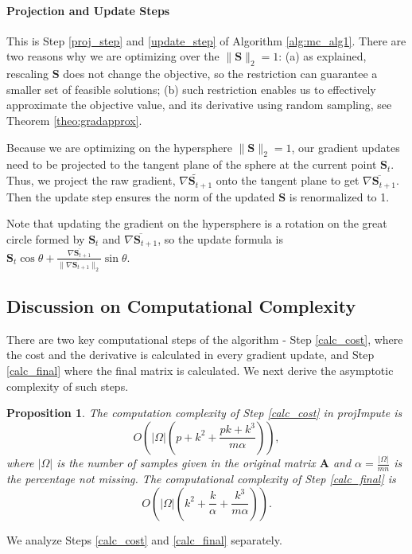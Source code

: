 \documentclass[twoside,11pt]{article}
\newtheorem{prop}{Proposition}
\begin{document}
\paragraph*{Projection and Update Steps}
This is Step \ref{proj_step} and \ref{update_step} of Algorithm \ref{alg:mc_alg1}. 
There are two reasons why we are optimizing over the $\|\bm{S}\|_2=1$: (a) as explained, rescaling $\bm{S}$ does not change the objective, so the restriction can guarantee a smaller set of feasible solutions;
(b) such restriction   enables us to effectively approximate the objective value, and its derivative using random sampling,   see Theorem \ref{theo:gradapprox}. 

Because we are optimizing on the hypersphere $\|\bm{S}\|_2=1$, our gradient updates need to be projected to the tangent plane of the sphere at the current point $\bm{S}_t$. Thus, we project the raw gradient, $\tilde{\nabla \bm{S}_{t+1}}$ onto the tangent plane to get $\overline{\nabla \bm{S}_{t+1}}$. Then the update step ensures the norm of  the updated $\bm{S}$ is renormalized to  1.

Note that updating the gradient on the hypersphere is a rotation on the great circle formed by  $\bm{S}_t$ and $\overline{\nabla \bm{S}_{t+1}}$, so the update formula is  $\bm{S}_t \cos \theta + \frac{\overline{\nabla \bm{S}_{t+1}}}{\|\overline{\nabla \bm{S}_{t+1}}\|_2} \sin \theta$.

\subsection{Discussion on Computational Complexity}
There are two key computational steps of the algorithm - Step \ref{calc_cost}, where the cost and the derivative is calculated in every gradient update, and Step \ref{calc_final} where the final matrix is calculated. 
We next derive the   asymptotic complexity of such steps.
\begin{prop}
\label{prop:complexproj}
 The computation complexity of Step \ref{calc_cost} in projImpute is $$O\left(|\Omega| \left(p+k^2+\frac{pk+k^3}{m\alpha}\right)\right),$$where $|\Omega|$ is the number of samples given in the original matrix $\bm{A}$ and $\alpha=\frac{|\Omega|}{mn}$ is the percentage not missing. The computational complexity of Step \ref{calc_final} is $$O\left(|\Omega|\left(k^2+\frac{k}{\alpha}+\frac{k^3}{m\alpha}\right)\right).$$
\end{prop}
\proof 
We analyze  Steps \ref{calc_cost}  and \ref{calc_final}   separately. 
\end{document}
